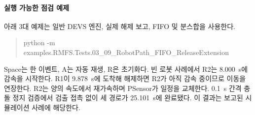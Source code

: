 \documentclass[11pt,a4paper]{article}
\theoremstyle{remark}
\begin{document}
\paragraph{실행 가능한 점검 예제}
아래 3대 예제는 일반 DEVS 엔진, 실제 해제 보고, FIFO 및 분스합을 사용한다.
\begin{quote}\small\ttfamily
python -m examples.RMFS.Tests.03\_09\_RobotPath\_FIFO\_ReleaseExtension
\end{quote}
Space는 한 이벤트, A는 자동 재생, R은 초기화다. 빈 로봇 사례에서 R2는 8.000~s에 감속을 시작한다. R1이 9.878~s에 도착해 해제하면 R2가 아직 감속 중이므로 이동을 연장한다. R2는 양의 속도에서 재가속하며 PSensor가 일정을 교체한다. 0.1~s 간격 충돌 정지 검증에서 검출 접촉 없이 세 경로가 25.101~s에 완료됐다. 이 결과는 보고된 시뮬레이션 사례에 해당한다.
\end{document}
